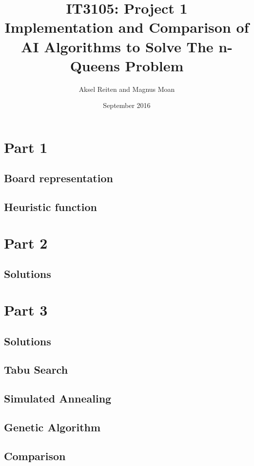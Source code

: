 \documentclass{article}
\title{IT3105: Project 1 \\ Implementation and Comparison of AI Algorithms to Solve The n-Queens Problem}
\author{Aksel Reiten and Magnus Moan}
\date{September 2016}
\begin{document}
\maketitle
\tableofcontents

\section{Part 1}
\subsection{Board representation}
\subsection{Heuristic function}

\section{Part 2}
\subsection{Solutions}

\section{Part 3}
\subsection{Solutions}
\subsection{Tabu Search}
\subsection{Simulated Annealing}
\subsection{Genetic Algorithm}
\subsection{Comparison}
\end{document}
